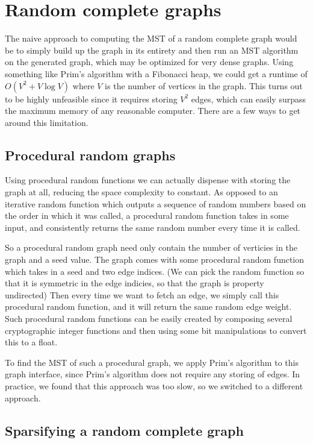 \documentclass[a4paper, 10pt, twocolumn, twoside]{article}
\begin{document}
\section{Random complete graphs}

The naive approach to computing the MST of a random complete graph would be to simply build up the graph in its entirety and then run an MST algorithm on the generated graph, which may be optimized for very dense graphs. Using something like Prim's algorithm with a Fibonacci heap, we could get a runtime of $O(V^2+V\log V)$ where $V$ is the number of vertices in the graph. This turns out to be highly unfeasible since it requires storing $V^2$ edges, which can easily surpass the maximum memory of any reasonable computer. There are a few ways to get around this limitation.

\subsection{Procedural random graphs}
\label{sec:Preparation}

Using procedural random functions we can actually dispense with storing the graph at all, reducing the space complexity to constant. As opposed to an iterative random function which outputs a sequence of random numbers based on the order in which it was called, a procedural random function takes in some input, and consistently returns the same random number every time it is called. 

So a procedural random graph need only contain the number of verticies in the graph and a seed value. The graph comes with some procedural random function which takes in a seed and two edge indices. (We can pick the random function so that it is symmetric in the edge indicies, so that the graph is property undirected) Then every time we want to fetch an edge, we simply call this procedural random function, and it will return the same random edge weight. Such procedural random functions can be easily created by composing several cryptographic integer functions and then using some bit manipulations to convert this to a float.

To find the MST of such a procedural graph, we apply Prim's algorithm to this graph interface, since Prim's algorithm does not require any storing of edges. In practice, we found that this approach was too slow, so we switched to a different approach.

\subsection{Sparsifying a random complete graph}
\end{document}
